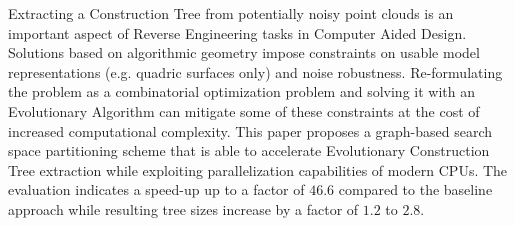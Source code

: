 Extracting a Construction Tree from potentially noisy point clouds is an important aspect of Reverse Engineering tasks in Computer Aided Design. 
Solutions based on algorithmic geometry impose constraints on usable model representations (e.g. quadric surfaces only) and noise robustness. 
Re-formulating the problem as a combinatorial optimization problem and solving it with an Evolutionary Algorithm can mitigate some of these constraints at the cost of increased computational complexity. 
This paper proposes a graph-based search space partitioning scheme that is able to accelerate Evolutionary Construction Tree extraction while exploiting parallelization capabilities of modern CPUs.
The evaluation indicates a speed-up up to a factor of $46.6$ compared to the baseline approach while resulting tree sizes increase by a factor of $1.2$ to $2.8$. 
